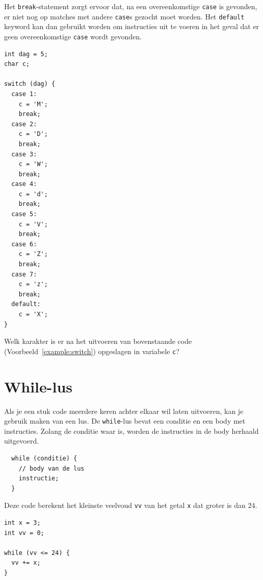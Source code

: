 \documentclass[11pt,fleqn]{book} %
\begin{document}
Het \texttt{break}-statement zorgt ervoor dat, na een overeenkomstige \texttt{case} is gevonden, er niet nog op matches met andere \texttt{case}s gezocht moet worden. Het \texttt{default} keyword kan dan gebruikt worden om instructies uit te voeren in het geval dat er geen overeenkomstige \texttt{case} wordt gevonden.

\begin{example}
	\label{example:switch}
	\phantom{ }
	\begin{verbatim}
int dag = 5;
char c;

switch (dag) {
  case 1:
    c = 'M';
    break;
  case 2:
    c = 'D';
    break;
  case 3:
    c = 'W';
    break;
  case 4:
    c = 'd';
    break;
  case 5:
    c = 'V';
    break;
  case 6:
    c = 'Z';
    break;
  case 7:
    c = 'z';
    break;
  default:
    c = 'X';
}
	\end{verbatim}
\end{example}

\begin{exercise}
	Welk karakter is er na het uitvoeren van bovenstaande code (Voorbeeld~\ref{example:switch}) opgeslagen in variabele \texttt{c}?
\end{exercise}

\section{While-lus}
Als je een stuk code meerdere keren achter elkaar wil laten uitvoeren, kan je gebruik maken van een lus. De \texttt{while}-lus bevat een conditie en een body met instructies. Zolang de conditie waar is, worden de instructies in de body herhaald uitgevoerd.

\begin{definition}[While]
	\phantom{ }
	\begin{verbatim}
  while (conditie) {
    // body van de lus
    instructie;
  }
	\end{verbatim}
	\vspace{0cm}
\end{definition}

\begin{example}[While]
	Deze code berekent het kleinste veelvoud \texttt{vv} van het getal \texttt{x} dat groter is dan 24.
	\begin{verbatim}
int x = 3;
int vv = 0;

while (vv <= 24) {
  vv += x;
}
	\end{verbatim}
\end{example}
\end{document}

